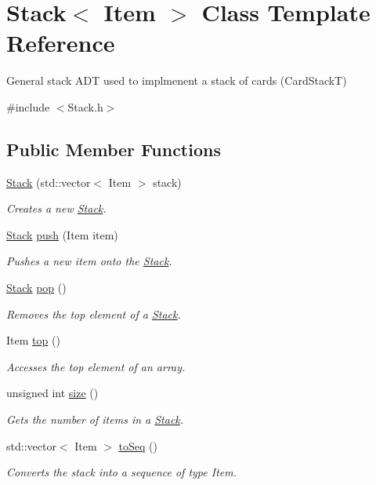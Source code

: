 \hypertarget{class_stack}{}\section{Stack$<$ Item $>$ Class Template Reference}
\label{class_stack}


General stack A\+DT used to implmenent a stack of cards (Card\+StackT)  




{\ttfamily \#include $<$Stack.\+h$>$}

\subsection*{Public Member Functions}
\begin{DoxyCompactItemize}
\item 
\hyperlink{class_stack_a083c179125f1254a5bdcd419406f108d}{Stack} (std\+::vector$<$ Item $>$ stack)
\begin{DoxyCompactList}\small\item\em Creates a new \hyperlink{class_stack}{Stack}. \end{DoxyCompactList}\item 
\hyperlink{class_stack}{Stack} \hyperlink{class_stack_a1b824e319a20ee57c37c1df2270f65d2}{push} (Item item)
\begin{DoxyCompactList}\small\item\em Pushes a new item onto the \hyperlink{class_stack}{Stack}. \end{DoxyCompactList}\item 
\hyperlink{class_stack}{Stack} \hyperlink{class_stack_abd1f79b5fc7fe4b04929987b54955b67}{pop} ()
\begin{DoxyCompactList}\small\item\em Removes the top element of a \hyperlink{class_stack}{Stack}. \end{DoxyCompactList}\item 
Item \hyperlink{class_stack_a84b12c3a32d914a499424888d34bca5e}{top} ()
\begin{DoxyCompactList}\small\item\em Accesses the top element of an array. \end{DoxyCompactList}\item 
unsigned int \hyperlink{class_stack_acfa3b26a78a68e3627bcb9d5198a0b3c}{size} ()
\begin{DoxyCompactList}\small\item\em Gets the number of items in a \hyperlink{class_stack}{Stack}. \end{DoxyCompactList}\item 
std\+::vector$<$ Item $>$ \hyperlink{class_stack_a9fd3ed2f352a7f9128e8c7fc48bc038d}{to\+Seq} ()
\begin{DoxyCompactList}\small\item\em Converts the stack into a sequence of type Item. \end{DoxyCompactList}\end{DoxyCompactItemize}


